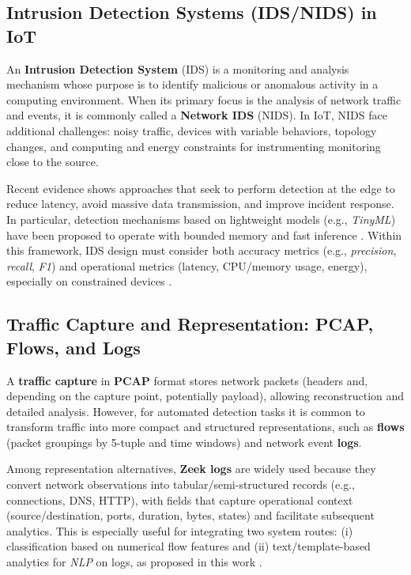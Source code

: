 \subsection{Intrusion Detection Systems (IDS/NIDS) in IoT}
An \textbf{Intrusion Detection System} (IDS) is a monitoring and analysis mechanism whose purpose is to identify malicious or anomalous activity in a computing environment. When its primary focus is the analysis of network traffic and events, it is commonly called a \textbf{Network IDS} (NIDS). In IoT, NIDS face additional challenges: noisy traffic, devices with variable behaviors, topology changes, and computing and energy constraints for instrumenting monitoring close to the source.

\newline
\newline
Recent evidence shows approaches that seek to perform detection at the edge to reduce latency, avoid massive data transmission, and improve incident response. In particular, detection mechanisms based on lightweight models (e.g., \textit{TinyML}) have been proposed to operate with bounded memory and fast inference \cite{Amuthadevi2025,Alwaisi2024,Tekin2023}. Within this framework, IDS design must consider both accuracy metrics (e.g., \textit{precision}, \textit{recall}, \textit{F1}) and operational metrics (latency, CPU/memory usage, energy), especially on constrained devices \cite{Tekin2023}.

\subsection{Traffic Capture and Representation: PCAP, Flows, and Logs}
A \textbf{traffic capture} in \textbf{PCAP} format stores network packets (headers and, depending on the capture point, potentially payload), allowing reconstruction and detailed analysis. However, for automated detection tasks it is common to transform traffic into more compact and structured representations, such as \textbf{flows} (packet groupings by 5-tuple and time windows) and network event \textbf{logs}.

\newline
\newline
Among representation alternatives, \textbf{Zeek logs} are widely used because they convert network observations into tabular/semi-structured records (e.g., connections, DNS, HTTP), with fields that capture operational context (source/destination, ports, duration, bytes, states) and facilitate subsequent analytics. This is especially useful for integrating two system routes: (i) classification based on numerical flow features and (ii) text/template-based analytics for \textit{NLP} on logs, as proposed in this work \cite{UNSWTonIoT,Neto2023CICIoT2023,Mehavilla2025}.

